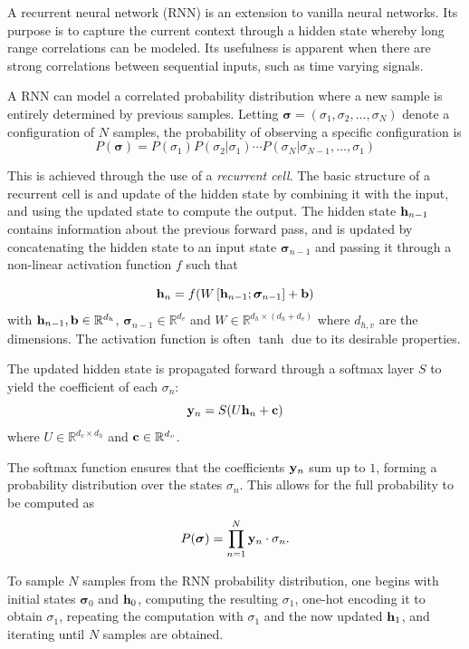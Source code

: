 A recurrent neural network (RNN) is an extension to vanilla neural networks. Its purpose is to
capture the current context through a hidden state whereby long
range correlations can be modeled. Its usefulness is apparent when there are
strong correlations between sequential inputs, such as time varying signals.

A RNN can model a correlated probability distribution where a new sample is
entirely determined by previous samples. 
Letting \(\bm{\sigma} = \left(\sigma_{1}, \sigma_{2}, \ldots,
  \sigma_{N}\right)\)  denote a configuration of \(N\) samples, the
probability of observing a specific configuration is
\begin{equation*}
  P(\bm\sigma) = P(\sigma_{1})P(\sigma_{2}|\sigma_{1})\cdots P(\sigma_{N}|\sigma_{N-1},\ldots,\sigma_{1})
\end{equation*}

This is achieved through the use of a \textit{recurrent cell}. The basic
structure of a recurrent cell is and update of the hidden state by 
combining it with the input, and using the updated state to compute the output.
The hidden state \(\vb{h}_{n-1}\)
contains information about the previous forward pass, and is updated by
concatenating the hidden state to an input state \(\bm{\sigma}_{n-1}\) and passing
it through a non-linear activation function \(f\) such that

\begin{equation*}
  \vb{h}_{n} = f(W\left[ \vb{h}_{n-1};\bm{\sigma}_{n-1} \right] + \vb{b})
\end{equation*}
with \(\vb{h}_{n-1},\vb{b}\in \mathbb{R}^{d_{h}}\),
\(\bm{\sigma}_{n-1}\in\mathbb{R}^{d_{v}}\) and \(W\in\mathbb{R}^{d_{h}\times
  (d_{h}+d_{v})}\) where \(d_{h,v}\) are the dimensions. The activation function
is often \(\tanh\) due to its desirable properties.

The updated hidden state is propagated forward through a softmax layer \(S\) to yield
the coefficient of each \(\sigma_{n}\):
\begin{equation*}
  \vb{y}_{n} = S(U\vb{h}_{n} + \vb{c})
\end{equation*}
where \(U\in\mathbb{R}^{d_{v}\times d_{h}}\) and
\(\vb{c}\in\mathbb{R}^{d_{v}}\).

The softmax function ensures that the
coefficients \(\vb{y}_{n}\) sum up to \(1\), forming a probability distribution
over the states \(\sigma_{n}\). This allows for the full probability to be
computed as
\begin{equation*}
  P(\bm{\sigma}) = \prod_{n=1}^{N}\vb{y}_{n}\cdot \sigma_{n}.
\end{equation*}

To sample \(N\) samples from the RNN probability distribution, one begins with
initial states \(\bm{\sigma}_{0}\) and \(\vb{h}_{0}\), computing the resulting
\(\sigma_{1}\), one-hot encoding it to obtain \(\sigma_{1}\), repeating the
computation with \(\sigma_{1}\) and the now updated \(\vb{h}_{1}\), and
iterating until \(N\) samples are obtained.

